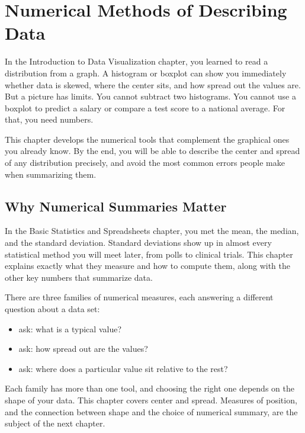 \chapter{Numerical Methods of Describing Data}

In the Introduction to Data Visualization chapter, you learned to read a distribution from a graph.
A histogram or boxplot can show you immediately whether data is skewed,
where the center sits, and how spread out the values are. But a picture
has limits. You cannot subtract two histograms. You cannot use a boxplot
to predict a salary or compare a test score to a national average. For
that, you need numbers.

This chapter develops the numerical tools that complement the graphical
ones you already know. By the end, you will be able to describe the center and spread of any
distribution precisely, and avoid the most common errors people make when summarizing them.

\section{Why Numerical Summaries Matter}

In the Basic Statistics and Spreadsheets chapter, you met the mean, the median, and the
standard deviation. Standard deviations show up in almost every
statistical method you will meet later, from polls to clinical trials. This
chapter explains exactly what they measure and how to compute them, along
with the other key numbers that summarize data.

There are three families of numerical measures, each answering a
different question about a data set:

\begin{itemize}
    \item {} ask: what is a typical value?
    \item {}
    ask: how spread out are the values?
    \item {}
    ask: where does a particular value sit relative to the rest?
\end{itemize}

Each family has more than one tool, and choosing the right one depends
on the shape of your data.
This chapter covers center and spread. Measures of position, and the connection between shape and
the choice of numerical summary, are the subject of the next chapter.

